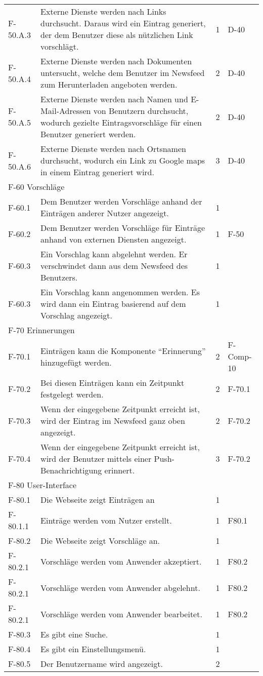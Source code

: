 \begin{tabularx}{\textwidth}{|l|X|l|l|}
    F-50.A.3 & Externe Dienste werden nach Links durchsucht. Daraus wird ein Eintrag generiert, der dem Benutzer diese als nützlichen Link vorschlägt. & 1 & D-40\\
    F-50.A.4 & Externe Dienste werden nach Dokumenten untersucht, welche dem Benutzer im Newsfeed zum Herunterladen angeboten werden. & 2 & D-40\\
    F-50.A.5 & Externe Dienste werden nach Namen und E-Mail-Adressen von Benutzern durchsucht, wodurch gezielte Eintragsvorschläge für einen Benutzer generiert werden. & 2 & D-40\\
    F-50.A.6 & Externe Dienste werden nach Ortsnamen durchsucht, wodurch ein Link zu Google maps in einem Eintrag generiert wird. & 3 & D-40\\
    \hline
    \multicolumn{4}{|l|}{F-60 Vorschläge}\\
    \hline 
    F-60.1 & Dem Benutzer werden Vorschläge anhand der Einträgen anderer Nutzer angezeigt. & 1 & \\
    F-60.2 & Dem Benutzer werden Vorschläge für Einträge anhand von externen Diensten angezeigt. & 1 & F-50 \\
    F-60.3 & Ein Vorschlag kann abgelehnt werden. Er verschwindet dann aus dem Newsfeed des Benutzers. & 1 & \\
    F-60.3 & Ein Vorschlag kann angenommen werden. Es wird dann ein Eintrag basierend auf dem Vorschlag angezeigt. & 1 & \\
    \hline
    \multicolumn{4}{|l|}{F-70 Erinnerungen}\\
    \hline
    F-70.1 & Einträgen kann die Komponente \enquote{Erinnerung} hinzugefügt werden. & 2 & F-Comp-10 \\
    F-70.2 & Bei diesen Einträgen kann ein Zeitpunkt festgelegt werden. & 2 & F-70.1 \\
    F-70.3 & Wenn der eingegebene Zeitpunkt erreicht ist, wird der Eintrag im Newsfeed ganz oben angezeigt. & 2 & F-70.2 \\
    F-70.4 & Wenn der eingegebene Zeitpunkt erreicht ist, wird der Benutzer mittels einer Push-Benachrichtigung erinnert. & 3 & F-70.2 \\
    \hline
    \multicolumn{4}{|l|}{F-80 User-Interface}\\
    \hline
    F-80.1 & Die Webseite zeigt Einträgen an & 1 & \\
    F-80.1.1 & Einträge werden vom Nutzer erstellt. & 1 & F80.1\\
    F-80.2 & Die Webseite zeigt Vorschläge an. & 1 &  \\
    F-80.2.1 & Vorschläge werden vom Anwender akzeptiert. & 1 &  F80.2\\
    F-80.2.1 & Vorschläge werden vom Anwender abgelehnt. & 1 &  F80.2\\
    F-80.2.1 & Vorschläge werden vom Anwender bearbeitet. & 1 &  F80.2\\
    F-80.3 & Es gibt eine Suche. & 1 &  \\
    F-80.4 & Es gibt ein Einstellungsmenü. & 1 & \\
    F-80.5 & Der Benutzername wird angezeigt. & 2 & \\
    


\end{tabularx}
